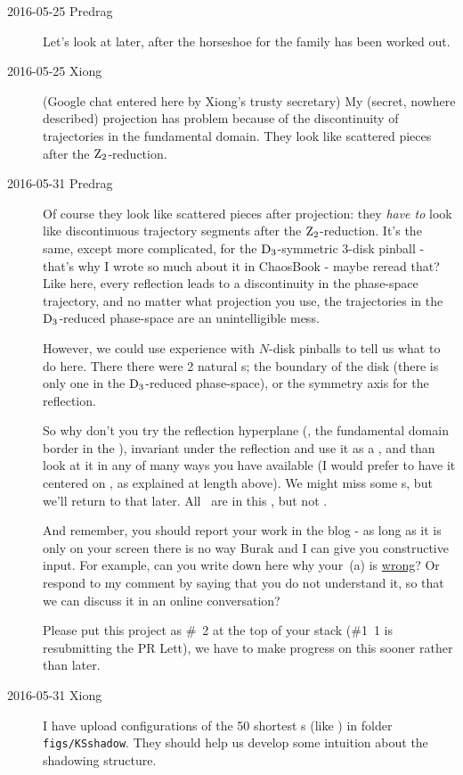 \begin{description}
\item[2016-05-25 Predrag]
  Let's look at  later, after the horseshoe for the 
  family has been worked out.

\item[2016-05-25 Xiong] (Google chat entered here by Xiong's trusty secretary)
My (secret,  nowhere described) projection has problem because of the
discontinuity of trajectories in the fundamental domain. They look like
scattered pieces after the $\textrm{Z}_{2}$-reduction.

\item[2016-05-31 Predrag]
Of course they look like scattered pieces after projection: they
\emph{have to} look like discontinuous trajectory segments after the
$\textrm{Z}_{2}$-reduction. It's the same, except more complicated, for the
$\textrm{D}_{3}$-symmetric 3-disk pinball - that's why I wrote so much about it in
ChaosBook - maybe reread that? Like here, every reflection leads to a
discontinuity in the phase-space trajectory, and no matter what
projection you use, the trajectories in the $\textrm{D}_{3}$-reduced phase-space
are an unintelligible mess.

However, we could use experience with $N$-disk pinballs to tell us what
to do here. There there were 2 natural \PoincSec s; the boundary of the
disk (there is only one in the $\textrm{D}_{3}$-reduced phase-space), or the
symmetry axis for the reflection.

So why don't you try the reflection hyperplane (\ie, the fundamental
domain border in the {\fFslice}), invariant under the reflection
 and use it as a \PoincSec, and than look at it in any
of many ways you have available (I would prefer to have it centered on
, as explained at length above). We might miss some \rpo s, but we'll
return to that later. All \eqva\ are in this \PoincSec, but not \reqva.

And remember, you should report your work in the blog - as long as it is
only on your screen there is no way Burak and I can give you constructive
input. For example, can you write down here why your
\,(a) is \underline{wrong}? Or respond to my
comment by saying that you do not understand it, so that we can discuss
it in an online conversation?

Please put this project as \#~2 at the top of your stack (\#1~1 is
resubmitting the PR Lett), we have to make progress on this sooner rather
than later.

\item[2016-05-31 Xiong]
I have upload configurations of the 50 shortest \rpo s (like
) in folder \texttt{figs/KSshadow}. They should help
us develop some intuition about the shadowing structure.


\end{description}

